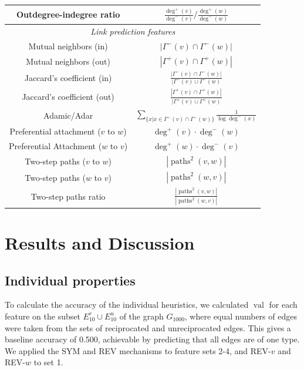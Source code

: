 \documentclass[conference]{IEEEtran}
\begin{document}
\begin{table}[!t]
\begin{tabular}{|c||c|}
\hline
Outdegree-indegree ratio & $\frac{\deg^+(v)}{\deg^-(v)} / \frac{\deg^+(w)}{\deg^-(w)} $ \\
\hline
\multicolumn{2}{|c|}{\emph{Link prediction features}} \\
\hline
Mutual neighbors (in) & $|\Gamma^-(v) \cap \Gamma^-(w)|$ \\
Mutual neighbors (out) & $|\Gamma^+(v) \cap \Gamma^+(w)|$ \\
\hline
Jaccard's coefficient (in) & $\frac{|\Gamma^-(v) \cap \Gamma^-(w)|}{|\Gamma^-(v) \cup \Gamma^-(w)}$ \\
Jaccard's coefficient (out) & $\frac{|\Gamma^+(v) \cap \Gamma^+(w)|}{|\Gamma^+(v) \cup \Gamma^+(w)}$ \\
\hline
Adamic/Adar & $\sum_{\{x|x \in \Gamma^-(v) \cap \Gamma^-(w)\}} \frac{1}{\log{\deg^-(x)}}$ \\
\hline
Preferential attachment ($v$ to $w$) & $\deg^+(v)\cdot \deg^-(w)$ \\
Preferential Attachment ($w$ to $v$) & $\deg^+(w)\cdot \deg^-(v)$ \\
\hline
Two-step paths ($v$ to $w$) & $ |\operatorname{paths}^2(v,w)|$ \\
Two-step paths ($w$ to $v$) & $ |\operatorname{paths}^2(w,v)|$ \\
\hline
Two-step paths ratio & $\frac{|\operatorname{paths}^2(v,w)|}{|\operatorname{paths}^2(w,v)|}$ \\
\hline
\end{tabular}
\end{table}

\section{Results and Discussion}

\subsection{Individual properties}
To calculate the accuracy of the individual heuristics, we calculated $\operatorname{val}$ for each feature on the subset $E_{10}^r \cup E_{10}^u$ of the graph $G_{1000}$, where equal numbers of edges were taken from the sets of reciprocated and unreciprocated edges. 
This gives a baseline accuracy of 0.500, achievable by predicting that all edges are of one type. 
We applied the SYM and REV mechanisms to feature sets 2-4, and REV-$v$ and REV-$w$ to set 1.
\end{document}
